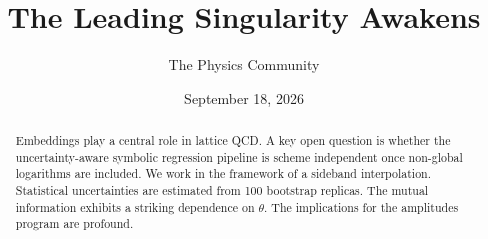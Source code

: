 \documentclass[11pt]{article}
\title{The Leading Singularity Awakens}
\author{The Physics Community}
\date{September 18, 2026}
\numberwithin{equation}{section}
\theoremstyle{definition}
\theoremstyle{remark}
\begin{document}
\maketitle
\begin{abstract}
Embeddings play a central role in lattice QCD. A key open question is
whether the uncertainty-aware symbolic regression pipeline is scheme
independent once non-global logarithms are included. We work in the
framework of a sideband interpolation. Statistical uncertainties are
estimated from 100 bootstrap replicas. The mutual information exhibits a
striking dependence on $\theta$. The implications for the amplitudes
program are profound.
\end{abstract}
\tableofcontents





\nocite{*}


\end{document}
